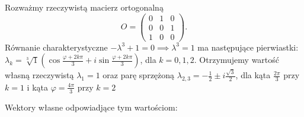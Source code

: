 \begin{example}
Rozważmy rzeczywistą macierz ortogonalną
$$O = \begin{pmatrix} 0 & 1 & 0 \\ 0 & 0 & 1 \\ 1 & 0 & 0 \end{pmatrix}.$$
Równanie charakterystyczne $-\lambda^3 + 1 = 0 \implies \lambda^3 = 1$ ma następujące pierwiastki:
$\lambda_k = \sqrt[3]{1}(\cos{\frac{\varphi + 2k\pi}{3}} + i\sin{\frac{\varphi + 2k\pi}{3}})$, dla $k = 0, 1, 2$. Otrzymujemy wartość własną rzeczywistą $\lambda_1 = 1$ oraz parę sprzężoną $\lambda_{2,3} = -\frac12 \pm i\frac{\sqrt3}{2}$, dla kąta $\frac{2\pi}{3}$ przy $k=1$ i kąta $\varphi = \frac{4\pi}{3}$ przy $k=2$

Wektory własne odpowiadjące tym wartościom:
\end{example}
